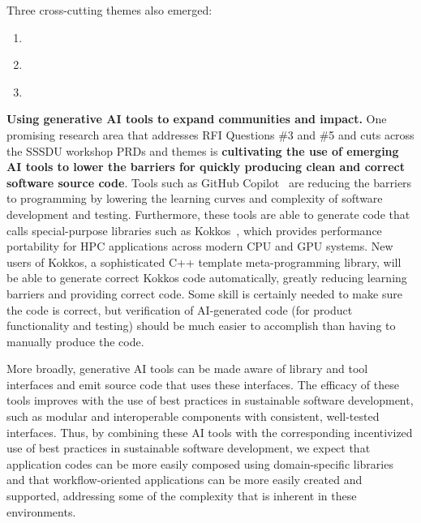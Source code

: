 \noindent
Three cross-cutting themes also emerged:
\begin{enumerate}
    \item \textbf{\THEMEONE{}}
    \item \textbf{\THEMETWO{}}
    \item \textbf{\THEMETHREE{}}
\end{enumerate}

{\bf Using generative AI tools to expand communities and impact.}
One promising research area that addresses RFI Questions \#3 and \#5 and cuts across the SSSDU workshop PRDs and themes is {\bf cultivating the use of emerging AI tools to lower the barriers for quickly producing clean and correct software source code}. Tools such as GitHub Copilot~\cite{copilot} are reducing the barriers to programming by lowering the learning curves and complexity of software development and testing.  Furthermore, these tools are able to generate code that calls special-purpose libraries such as Kokkos~\cite{kokkos}, which provides performance portability for HPC applications across modern CPU and GPU systems.  New users of Kokkos, a sophisticated C++ template meta-programming library, will be able to generate correct Kokkos code automatically, greatly reducing learning barriers and providing correct code.  Some skill is certainly needed to make sure the code is correct, but verification of AI-generated code (for product functionality and testing) should be much easier to accomplish than having to manually produce the code.

More broadly, generative AI tools can be made aware of library and tool interfaces and emit source code that uses these interfaces. The efficacy of these tools improves with the use of best practices in sustainable software development, such as modular and interoperable components with consistent, well-tested interfaces.  Thus, by combining these AI tools with the corresponding incentivized use of best practices in sustainable software development, we expect that application codes can be more easily composed using domain-specific libraries and that workflow-oriented applications can be more easily created and supported, addressing some of the complexity that is inherent in these environments. 

